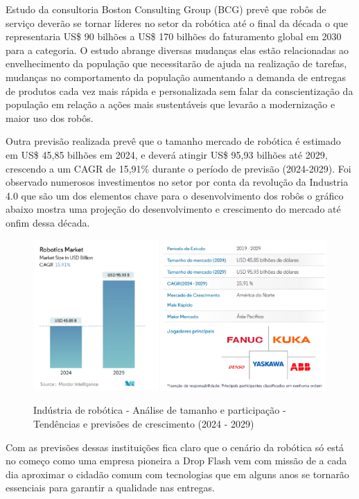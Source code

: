 Estudo da consultoria Boston Consulting Group (BCG) \cite{(BCG)} prevê que robôs de serviço deverão se tornar líderes no setor da robótica até o final da década o que representaria US\$ 90 bilhões a US\$ 170 bilhões do faturamento global em 2030 para a categoria. O estudo abrange diversas mudanças elas estão relacionadas ao envelhecimento da população que necessitarão de ajuda na realização de tarefas, mudanças no comportamento da população aumentando a demanda de entregas de produtos cada vez mais rápida e personalizada sem falar da conscientização da população em relação a ações mais sustentáveis que levarão a modernização e maior uso dos robôs.

Outra previsão realizada prevê que o tamanho mercado de robótica é estimado em US\$ 45,85 bilhões em 2024, e deverá atingir US\$ 95,93 bilhões até 2029, crescendo a um CAGR de 15,91\% durante o período de previsão (2024-2029). Foi observado numerosos investimentos no setor por conta da revolução da Industria 4.0 que são um dos elementos chave para o desenvolvimento dos robôs o gráfico abaixo mostra uma projeção do desenvolvimento e crescimento do mercado até onfim dessa década. 

\begin{figure} [!ht]
    \centering
    \caption{Indústria de robótica - Análise de tamanho e participação - Tendências e previsões de crescimento (2024 - 2029)}
    \includegraphics[width=0.9\linewidth]{figuras/orça drop.png}
    \label{fig:enter-label}
\end{figure}

Com as previsões dessas instituições fica claro que o cenário da robótica só está no começo como uma empresa pioneira a Drop Flash vem com missão de a cada dia aproximar o cidadão comum com tecnologias que em alguns anos se tornarão essenciais para garantir a qualidade nas entregas. 